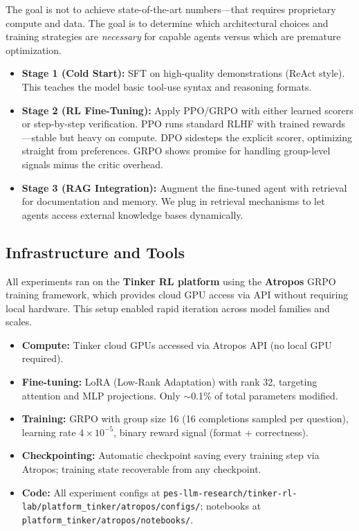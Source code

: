 \documentclass[12pt,a4paper]{report}
\theoremstyle{definition}
\begin{document}
The goal is not to achieve state-of-the-art numbers---that requires proprietary compute and data. The goal is to determine which architectural choices and training strategies are \textit{necessary} for capable agents versus which are premature optimization.

\begin{itemize}
    \item \textbf{Stage 1 (Cold Start):} SFT on high-quality demonstrations (ReAct style). This teaches the model basic tool-use syntax and reasoning formats.
    \item \textbf{Stage 2 (RL Fine-Tuning):} Apply PPO/GRPO with either learned scorers or step-by-step verification. PPO runs standard RLHF with trained rewards---stable but heavy on compute. DPO sidesteps the explicit scorer, optimizing straight from preferences. GRPO shows promise for handling group-level signals minus the critic overhead.
    \item \textbf{Stage 3 (RAG Integration):} Augment the fine-tuned agent with retrieval for documentation and memory. We plug in retrieval mechanisms to let agents access external knowledge bases dynamically.
\end{itemize}

\subsection{Infrastructure and Tools}
All experiments ran on the \textbf{Tinker RL platform} using the \textbf{Atropos} GRPO training framework, which provides cloud GPU access via API without requiring local hardware. This setup enabled rapid iteration across model families and scales.

\begin{itemize}
    \item \textbf{Compute:} Tinker cloud GPUs accessed via Atropos API (no local GPU required).
    \item \textbf{Fine-tuning:} LoRA (Low-Rank Adaptation) with rank 32, targeting attention and MLP projections. Only $\sim$0.1\% of total parameters modified.
    \item \textbf{Training:} GRPO with group size 16 (16 completions sampled per question), learning rate $4 \times 10^{-5}$, binary reward signal (format + correctness).
    \item \textbf{Checkpointing:} Automatic checkpoint saving every training step via Atropos; training state recoverable from any checkpoint.
    \item \textbf{Code:} All experiment configs at \texttt{pes-llm-research/tinker-rl-lab/platform\_tinker/atropos/configs/}; notebooks at \texttt{platform\_tinker/atropos/notebooks/}.
\end{itemize}
\end{document}
